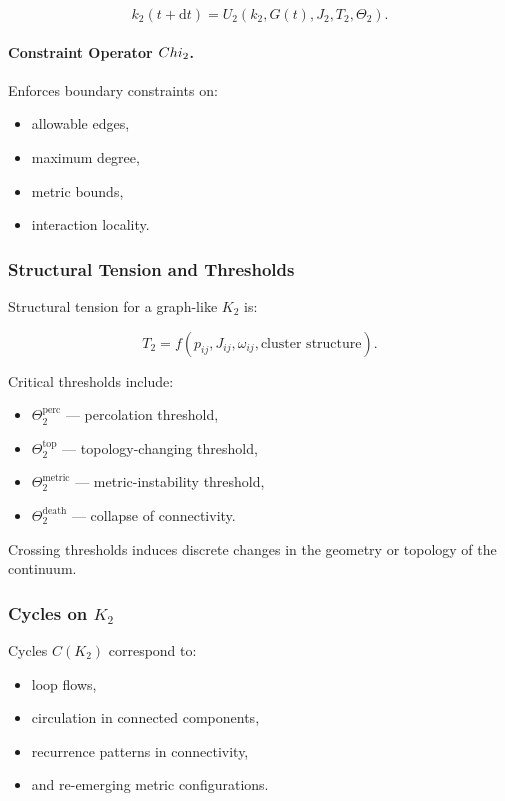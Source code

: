 \[
k_2(t+\mathrm{d}t) = U_2(k_2, G(t), J_2, T_2, \Theta_2).
\]

\paragraph{Constraint Operator \texorpdfstring{$Chi_2$}{\Chi_2}.}

Enforces boundary constraints on:

\begin{itemize}
    \item allowable edges,
    \item maximum degree,
    \item metric bounds,
    \item interaction locality.
\end{itemize}

\subsubsection{Structural Tension and Thresholds}

Structural tension for a graph-like $K_2$ is:

\[
T_2 = f(p_{ij}, J_{ij}, \omega_{ij}, \text{cluster structure}).
\]

Critical thresholds include:

\begin{itemize}
    \item $\Theta_2^{\text{perc}}$ — percolation threshold,
    \item $\Theta_2^{\text{top}}$ — topology-changing threshold,
    \item $\Theta_2^{\text{metric}}$ — metric-instability threshold,
    \item $\Theta_2^{\text{death}}$ — collapse of connectivity.
\end{itemize}

Crossing thresholds induces discrete changes in the geometry or topology
of the continuum.

\subsubsection{Cycles on \texorpdfstring{$K_2$}{K_2}}

Cycles $C(K_2)$ correspond to:

\begin{itemize}
    \item loop flows,
    \item circulation in connected components,
    \item recurrence patterns in connectivity,
    \item and re-emerging metric configurations.
\end{itemize}

